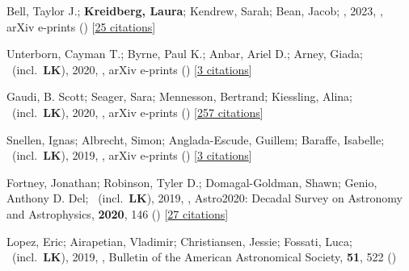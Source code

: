 \item[{\color{numcolor}\scriptsize11}] Bell, Taylor J.; \textbf{Kreidberg, Laura}; Kendrew, Sarah; Bean, Jacob; \etal, 2023, , arXiv e-prints () [\href{https://ui.adsabs.harvard.edu/abs/2023arXiv230106350B}{25 citations}]

\item[{\color{numcolor}\scriptsize10}] Unterborn, Cayman T.; Byrne, Paul K.; Anbar, Ariel D.; Arney, Giada; \etal\ (incl.\ \textbf{LK}), 2020, , arXiv e-prints () [\href{https://ui.adsabs.harvard.edu/abs/2020arXiv200708665U}{3 citations}]

\item[{\color{numcolor}\scriptsize9}] Gaudi, B. Scott; Seager, Sara; Mennesson, Bertrand; Kiessling, Alina; \etal\ (incl.\ \textbf{LK}), 2020, , arXiv e-prints () [\href{https://ui.adsabs.harvard.edu/abs/2020arXiv200106683G}{257 citations}]

\item[{\color{numcolor}\scriptsize8}] Snellen, Ignas; Albrecht, Simon; Anglada-Escude, Guillem; Baraffe, Isabelle; \etal\ (incl.\ \textbf{LK}), 2019, , arXiv e-prints () [\href{https://ui.adsabs.harvard.edu/abs/2019arXiv190801803S}{3 citations}]

\item[{\color{numcolor}\scriptsize7}] Fortney, Jonathan; Robinson, Tyler D.; Domagal-Goldman, Shawn; Genio, Anthony D. Del; \etal\ (incl.\ \textbf{LK}), 2019, , Astro2020: Decadal Survey on Astronomy and Astrophysics, \textbf{2020}, 146 () [\href{https://ui.adsabs.harvard.edu/abs/2019astro2020T.146F}{27 citations}]

\item[{\color{numcolor}\scriptsize6}] Lopez, Eric; Airapetian, Vladimir; Christiansen, Jessie; Fossati, Luca; \etal\ (incl.\ \textbf{LK}), 2019, , Bulletin of the American Astronomical Society, \textbf{51}, 522 ()

